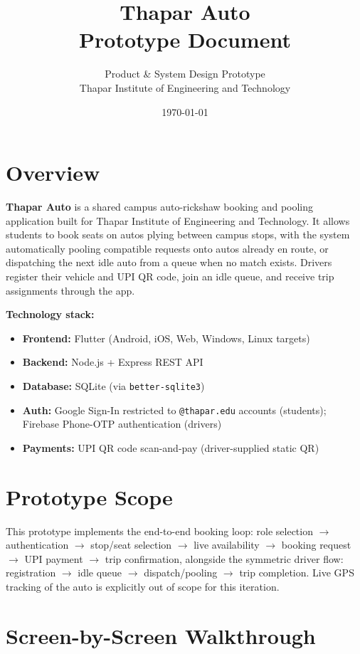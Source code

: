 \documentclass[11pt,a4paper]{article}
\title{\textbf{\Large Thapar Auto} \\[4pt] \large Prototype Document}
\author{Product \& System Design Prototype \\ Thapar Institute of Engineering and Technology}
\date{\today}
\begin{document}
\maketitle
\thispagestyle{fancy}

\section{Overview}
\textbf{Thapar Auto} is a shared campus auto-rickshaw booking and pooling application
built for Thapar Institute of Engineering and Technology. It allows students to book
seats on autos plying between campus stops, with the system automatically pooling
compatible requests onto autos already en route, or dispatching the next idle auto
from a queue when no match exists. Drivers register their vehicle and UPI QR code,
join an idle queue, and receive trip assignments through the app.

\textbf{Technology stack:}
\begin{itemize}[leftmargin=*, itemsep=2pt]
  \item \textbf{Frontend:} Flutter (Android, iOS, Web, Windows, Linux targets)
  \item \textbf{Backend:} Node.js + Express REST API
  \item \textbf{Database:} SQLite (via \texttt{better-sqlite3})
  \item \textbf{Auth:} Google Sign-In restricted to \texttt{@thapar.edu} accounts (students);
        Firebase Phone-OTP authentication (drivers)
  \item \textbf{Payments:} UPI QR code scan-and-pay (driver-supplied static QR)
\end{itemize}

\section{Prototype Scope}
This prototype implements the end-to-end booking loop: role selection $\rightarrow$
authentication $\rightarrow$ stop/seat selection $\rightarrow$ live availability
$\rightarrow$ booking request $\rightarrow$ UPI payment $\rightarrow$ trip confirmation,
alongside the symmetric driver flow: registration $\rightarrow$ idle queue
$\rightarrow$ dispatch/pooling $\rightarrow$ trip completion. Live GPS tracking of the
auto is explicitly out of scope for this iteration.

\section{Screen-by-Screen Walkthrough}
\end{document}

